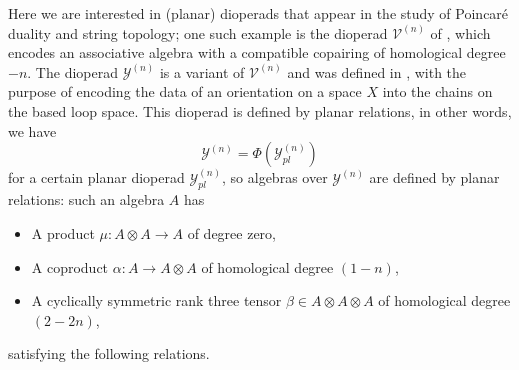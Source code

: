 \documentclass[11pt,a4paper]{amsart}
\newcommand{\scrY}{\mathscr{Y}}
\theoremstyle{definition}
\begin{document}
Here we are interested in (planar) dioperads that appear in the study of Poincar\'e duality and string topology; one such example is the dioperad $\mathscr{V}^{(n)}$ of \cite{poirier2019koszuality}, which encodes an associative algebra with a compatible copairing of homological degree $-n$. 
The dioperad $\scrY^{(n)}$ is a variant of $\mathscr{V}^{(n)}$ and was defined in \cite{emprin2025properadic}, with the purpose of encoding the data of an orientation on a space $X$ into the chains on the based loop space. This dioperad is defined by planar relations, in other words, we have
\[ \mathscr{Y}^{(n)} = \Phi(\mathscr{Y}^{(n)}_{pl})\]
for a certain planar dioperad $\mathscr{Y}^{(n)}_{pl}$, so algebras over $\mathscr{Y}^{(n)}$ are defined by planar relations: such an algebra $A$ has
\begin{itemize}
    \item A product $\mu \colon A \otimes A \to A$ of degree zero,
    \item A coproduct $\alpha \colon A \to A \otimes A$ of homological degree $(1-n)$,
    \item A cyclically symmetric rank three tensor $\beta \in A \otimes A \otimes A$ of homological degree $(2-2n)$,
\end{itemize} 
satisfying the following relations.
\end{document}
